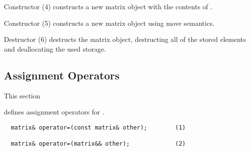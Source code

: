 Constructor (4) constructs a new matrix object with the contents of .


Constructor (5) constructs a new matrix object using move semantics.

Destructor (6) destructs the matrix object, destructing all of the stored elements and deallocating the used storage.


\subsection{Assignment Operators}
\hypertarget{assign_ops}{This section} defines assignment operators for .

\begin{verbatim}
  matrix& operator=(const matrix& other);        (1)

  matrix& operator=(matrix&& other);             (2)
\end{verbatim}



